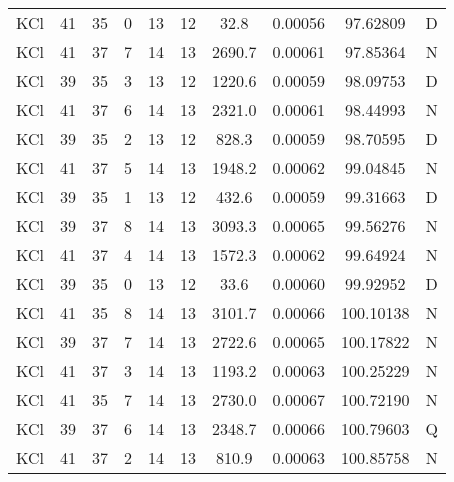 \begin{table*}[htp]
\begin{tabular}{cccccccccc}
KCl & 41 & 35 & 0 & 13 & 12 & 32.8 & 0.00056 & 97.62809 & D \\
KCl & 41 & 37 & 7 & 14 & 13 & 2690.7 & 0.00061 & 97.85364 & N \\
KCl & 39 & 35 & 3 & 13 & 12 & 1220.6 & 0.00059 & 98.09753 & D \\
KCl & 41 & 37 & 6 & 14 & 13 & 2321.0 & 0.00061 & 98.44993 & N \\
KCl & 39 & 35 & 2 & 13 & 12 & 828.3 & 0.00059 & 98.70595 & D \\
KCl & 41 & 37 & 5 & 14 & 13 & 1948.2 & 0.00062 & 99.04845 & N \\
KCl & 39 & 35 & 1 & 13 & 12 & 432.6 & 0.00059 & 99.31663 & D \\
KCl & 39 & 37 & 8 & 14 & 13 & 3093.3 & 0.00065 & 99.56276 & N \\
KCl & 41 & 37 & 4 & 14 & 13 & 1572.3 & 0.00062 & 99.64924 & N \\
KCl & 39 & 35 & 0 & 13 & 12 & 33.6 & 0.00060 & 99.92952 & D \\
KCl & 41 & 35 & 8 & 14 & 13 & 3101.7 & 0.00066 & 100.10138 & N \\
KCl & 39 & 37 & 7 & 14 & 13 & 2722.6 & 0.00065 & 100.17822 & N \\
KCl & 41 & 37 & 3 & 14 & 13 & 1193.2 & 0.00063 & 100.25229 & N \\
KCl & 41 & 35 & 7 & 14 & 13 & 2730.0 & 0.00067 & 100.72190 & N \\
KCl & 39 & 37 & 6 & 14 & 13 & 2348.7 & 0.00066 & 100.79603 & Q \\
KCl & 41 & 37 & 2 & 14 & 13 & 810.9 & 0.00063 & 100.85758 & N \\
\hline
\end{tabular}

\par 
\end{table*}
